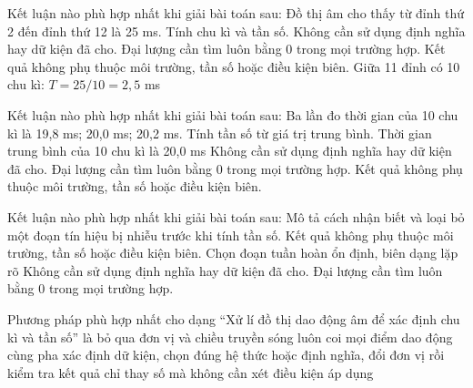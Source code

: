 \begin{ex}
Kết luận nào phù hợp nhất khi giải bài toán sau: Đồ thị âm cho thấy từ đỉnh thứ 2 đến đỉnh thứ 12 là 25 ms. Tính chu kì và tần số.
\choice
{Không cần sử dụng định nghĩa hay dữ kiện đã cho.}
{Đại lượng cần tìm luôn bằng 0 trong mọi trường hợp.}
{Kết quả không phụ thuộc môi trường, tần số hoặc điều kiện biên.}
{\True Giữa 11 đỉnh có 10 chu kì: $T=25/10=2,5$ ms}
\end{ex}

\begin{ex}
Kết luận nào phù hợp nhất khi giải bài toán sau: Ba lần đo thời gian của 10 chu kì là 19,8 ms; 20,0 ms; 20,2 ms. Tính tần số từ giá trị trung bình.
\choice
{\True Thời gian trung bình của 10 chu kì là 20,0 ms}
{Không cần sử dụng định nghĩa hay dữ kiện đã cho.}
{Đại lượng cần tìm luôn bằng 0 trong mọi trường hợp.}
{Kết quả không phụ thuộc môi trường, tần số hoặc điều kiện biên.}
\end{ex}

\begin{ex}
Kết luận nào phù hợp nhất khi giải bài toán sau: Mô tả cách nhận biết và loại bỏ một đoạn tín hiệu bị nhiễu trước khi tính tần số.
\choice
{Kết quả không phụ thuộc môi trường, tần số hoặc điều kiện biên.}
{\True Chọn đoạn tuần hoàn ổn định, biên dạng lặp rõ}
{Không cần sử dụng định nghĩa hay dữ kiện đã cho.}
{Đại lượng cần tìm luôn bằng 0 trong mọi trường hợp.}
\end{ex}

\begin{ex}
Phương pháp phù hợp nhất cho dạng “Xử lí đồ thị dao động âm để xác định chu kì và tần số” là
\choice
{bỏ qua đơn vị và chiều truyền sóng}
{luôn coi mọi điểm dao động cùng pha}
{\True xác định dữ kiện, chọn đúng hệ thức hoặc định nghĩa, đổi đơn vị rồi kiểm tra kết quả}
{chỉ thay số mà không cần xét điều kiện áp dụng}
\end{ex}

